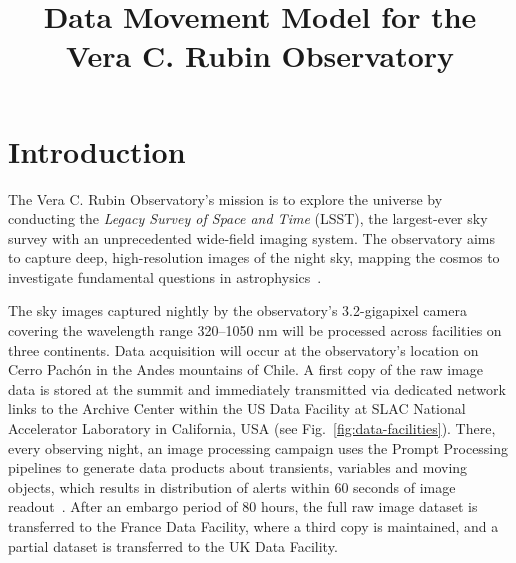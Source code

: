 \documentclass{webofc}
\begin{document}
\title{Data Movement Model for the Vera C. Rubin Observatory}




\maketitle

\section{Introduction}
\label{introduction}
The Vera C. Rubin Observatory's mission is to explore the universe by conducting the \textit{Legacy Survey of Space and Time} (LSST), the largest-ever sky survey with an unprecedented wide-field imaging system. The observatory aims to capture deep, high-resolution images of the night sky, mapping the cosmos to investigate fundamental questions in astrophysics\ \cite{Ivezic:2019}.

The sky images captured nightly by the observatory's 3.2-gigapixel camera covering the wavelength range 320--1050 nm will be processed across facilities on three continents. Data acquisition will occur at the observatory's location on Cerro Pachón in the Andes mountains of Chile. A first copy of the raw image data is stored at the summit and immediately transmitted via dedicated network links to the Archive Center within the US Data Facility at SLAC National Accelerator Laboratory in California, USA (see Fig.\ \ref{fig:data-facilities}). There, every observing night, an image processing campaign uses the Prompt Processing pipelines to generate data products about transients, variables and moving objects, which results in distribution of alerts within 60 seconds of image readout\ \cite{LSE-163,melissa_graham_2022_7011229}. After an embargo period of 80 hours, the full raw image dataset is transferred to the France Data Facility, where a third copy is maintained, and a partial dataset is transferred to the UK Data Facility.
\end{document}
